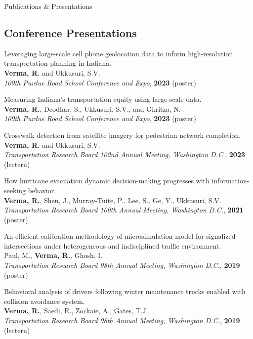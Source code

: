 \documentclass{CV} %
\begin{document}
\begin{rSection}{Publications \& Presentations}
    \subsection*{Conference Presentations}
    \begin{etaremune}
        \item Leveraging large-scale cell phone geolocation data to inform high-resolution transportation planning in Indiana.
        \\ \textbf{Verma, R.} and Ukkusuri, S.V.
        \\ \textit{109th Purdue Road School Conference and Expo}, \textbf{2023} (poster)

        \item Measuring Indiana's transportation equity using large-scale data.
        \\ \textbf{Verma, R.}, Deodhar, S., Ukkusuri, S.V., and Gkritza, N.
        \\ \textit{109th Purdue Road School Conference and Expo}, \textbf{2023} (poster)

        \item Crosswalk detection from satellite imagery for pedestrian network completion.
        \\ \textbf{Verma, R.} and Ukkusuri, S.V.
        \\ \textit{Transportation Research Board 102nd Annual Meeting, Washington D.C.}, \textbf{2023} (lectern)

        \item How hurricane evacuation dynamic decision-making progresses with information-seeking behavior.
        \\ \textbf{Verma, R.}, Shen, J., Murray-Tuite, P., Lee, S., Ge, Y., Ukkusuri, S.V.
        \\ \textit{Transportation Research Board 100th Annual Meeting, Washington D.C.}, \textbf{2021} (poster)
    
        \item An efficient calibration methodology of microsimulation model for signalized intersections under heterogeneous and indisciplined traffic environment.
        \\ Paul, M., \textbf{Verma, R.}, Ghosh, I.
        \\ \textit{Transportation Research Board 98th Annual Meeting, Washington D.C.}, \textbf{2019} (poster)
        
        \item Behavioral analysis of drivers following winter maintenance trucks enabled with collision avoidance system.
        \\ \textbf{Verma, R.}, Saedi, R., Zockaie, A., Gates, T.J.
        \\ \textit{Transportation Research Board 98th Annual Meeting, Washington D.C.}, \textbf{2019} (lectern)


\end{etaremune}
\end{rSection}
\end{document}
